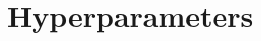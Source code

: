 \documentclass{article}
\begin{document}




\appendix

\section{Hyperparameters}
\label{app:hyperparameter}
\end{document}
